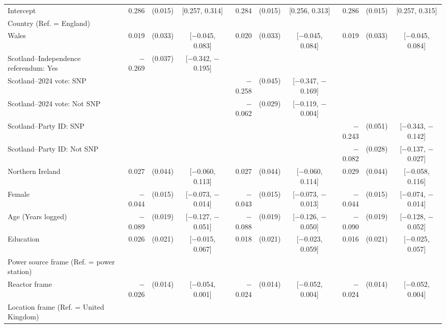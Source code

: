 \begin{landscape}
\begin{longtable}[t]{>{\raggedright\arraybackslash}p{2.8in}rrcrrcrrc}
\endfoot
\bottomrule
\endlastfoot
Intercept & 0.286 & (0.015) & {}[0.257, 0.314] & 0.284 & (0.015) & {}[0.256, 0.313] & 0.286 & (0.015) & {}[0.257, 0.315]\\
Country (Ref. = England) &  &  &  &  &  &  &  &  & \\
\hspace{1em}Wales & 0.019 & (0.033) & {}[$-$0.045, 0.083] & 0.020 & (0.033) & {}[$-$0.045, 0.084] & 0.019 & (0.033) & {}[$-$0.045, 0.084]\\
\hspace{1em}Scotland--Independence referendum: Yes & $-$0.269 & (0.037) & {}[$-$0.342, $-$0.195] &  &  &  &  &  & \\
\hspace{1em}Scotland--2024 vote: SNP &  &  &  & $-$0.258 & (0.045) & {}[$-$0.347, $-$0.169] &  &  & \\
\hspace{1em}Scotland--2024 vote: Not SNP &  &  &  & $-$0.062 & (0.029) & {}[$-$0.119, $-$0.004] &  &  & \\
\hspace{1em}Scotland--Party ID: SNP &  &  &  &  &  &  & $-$0.243 & (0.051) & {}[$-$0.343, $-$0.142]\\
\hspace{1em}Scotland--Party ID: Not SNP &  &  &  &  &  &  & $-$0.082 & (0.028) & {}[$-$0.137, $-$0.027]\\
\hspace{1em}Northern Ireland & 0.027 & (0.044) & {}[$-$0.060, 0.113] & 0.027 & (0.044) & {}[$-$0.060, 0.114] & 0.029 & (0.044) & {}[$-$0.058, 0.116]\\
Female & $-$0.044 & (0.015) & {}[$-$0.073, $-$0.014] & $-$0.043 & (0.015) & {}[$-$0.073, $-$0.013] & $-$0.044 & (0.015) & {}[$-$0.074, $-$0.014]\\
Age (Years logged) & $-$0.089 & (0.019) & {}[$-$0.127, $-$0.051] & $-$0.088 & (0.019) & {}[$-$0.126, $-$0.050] & $-$0.090 & (0.019) & {}[$-$0.128, $-$0.052]\\
Education & 0.026 & (0.021) & {}[$-$0.015, 0.067] & 0.018 & (0.021) & {}[$-$0.023, 0.059] & 0.016 & (0.021) & {}[$-$0.025, 0.057]\\
Power source frame (Ref. = power station) &  &  &  &  &  &  &  &  & \\
\hspace{1em}Reactor frame & $-$0.026 & (0.014) & {}[$-$0.054, 0.001] & $-$0.024 & (0.014) & {}[$-$0.052, 0.004] & $-$0.024 & (0.014) & {}[$-$0.052, 0.004]\\
Location frame (Ref. = United Kingdom) &  &  &  &  &  &  &  &  & \\

\end{longtable}
\end{landscape}
